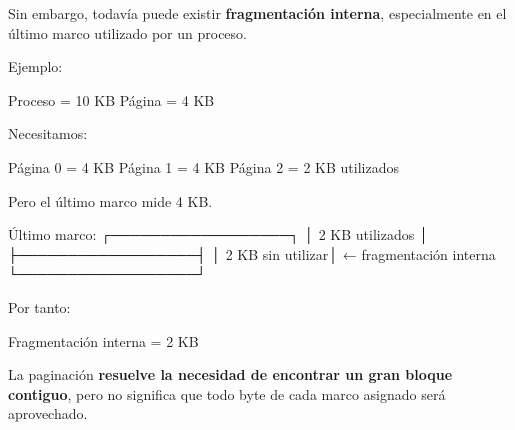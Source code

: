 \documentclass[
  spanish,
  letterpaper,
]{scrbook}
\newenvironment{Shaded}{\begin{snugshade}}{\end{snugshade}}
\newcommand{\NormalTok}[1]{\textcolor[rgb]{0.00,0.23,0.31}{#1}}
\begin{document}
Sin embargo, todavía puede existir \textbf{fragmentación interna},
especialmente en el último marco utilizado por un proceso.

Ejemplo:

\begin{Shaded}
\begin{Highlighting}[]
\NormalTok{Proceso = 10 KB}
\NormalTok{Página  = 4 KB}
\end{Highlighting}
\end{Shaded}

Necesitamos:

\begin{Shaded}
\begin{Highlighting}[]
\NormalTok{Página 0 = 4 KB}
\NormalTok{Página 1 = 4 KB}
\NormalTok{Página 2 = 2 KB utilizados}
\end{Highlighting}
\end{Shaded}

Pero el último marco mide 4 KB.

\begin{Shaded}
\begin{Highlighting}[]
\NormalTok{Último marco:}
\NormalTok{┌──────────────────┐}
\NormalTok{│ 2 KB utilizados  │}
\NormalTok{├──────────────────┤}
\NormalTok{│ 2 KB sin utilizar│ ← fragmentación interna}
\NormalTok{└──────────────────┘}
\end{Highlighting}
\end{Shaded}

Por tanto:

\begin{Shaded}
\begin{Highlighting}[]
\NormalTok{Fragmentación interna = 2 KB}
\end{Highlighting}
\end{Shaded}

\begin{tcolorbox}[enhanced jigsaw, arc=.35mm, bottomrule=.15mm, bottomtitle=1mm, breakable, colback=white, colbacktitle=quarto-callout-important-color!10!white, colframe=quarto-callout-important-color-frame, coltitle=black, left=2mm, leftrule=.75mm, opacityback=0, opacitybacktitle=0.6, rightrule=.15mm, title=\textcolor{quarto-callout-important-color}{\faExclamation}\hspace{0.5em}{Una precisión importante}, titlerule=0mm, toprule=.15mm, toptitle=1mm]

La paginación \textbf{resuelve la necesidad de encontrar un gran bloque
contiguo}, pero no significa que todo byte de cada marco asignado será
aprovechado.

\end{tcolorbox}
\end{document}
